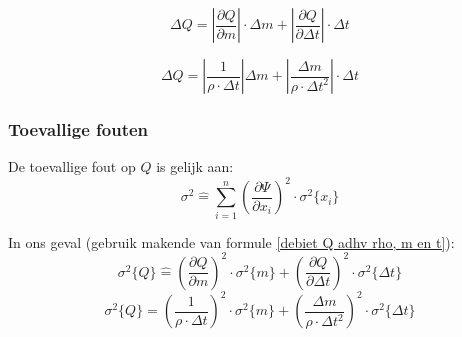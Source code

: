 \begin{equation*}
    \Delta Q = \left|\frac{\partial Q}{\partial m}\right|\cdot \Delta m + \left| \frac{\partial Q}{\partial \Delta t}\right| \cdot \Delta t
\end{equation*}

\begin{equation*}
    \Delta Q = \left|\frac{1}{\rho \cdot \Delta t}\right|\Delta m + \left|\frac{\Delta m}{\rho \cdot \Delta t^{2}}\right|\cdot \Delta t
\end{equation*}


\subsubsection{Toevallige fouten}
De toevallige fout op $Q$ is gelijk aan:
\begin{equation}
    \sigma^{2} \hat = \sum\limits_{i=1}^n(\frac{\partial \Psi}{\partial x_i})^{2} \cdot \sigma^{2} \{x_i\}
\end{equation}

In ons geval (gebruik makende van formule \eqref{debiet Q adhv rho, m en t}):
\begin{equation}
    \sigma^{2}\{Q\} \hat = (\frac{\partial Q}{\partial m})^{2} \cdot \sigma^{2}\{m\} + (\frac{\partial Q}{\partial \Delta t})^{2} \cdot \sigma^{2}\{\Delta t\}
\end{equation}
\begin{equation}
\sigma^{2}\{Q\} = (\frac{1}{\rho \cdot \Delta t})^{2} \cdot \sigma^{2}\{m\} + (\frac{\Delta m}{\rho \cdot \Delta t^{2}})^{2} \cdot \sigma^{2}\{\Delta t\}
\end{equation}





